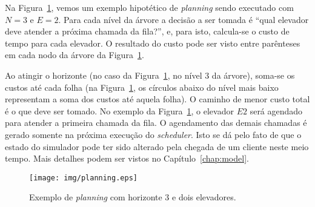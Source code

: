 Na Figura~\ref{fig:planning}, vemos um exemplo hipotético de \textit{planning}
sendo executado com $N = 3$ e $E = 2$. Para cada nível da árvore a decisão a ser
tomada é ``qual elevador deve atender a próxima chamada da fila?'', e, para
isto, calcula-se o custo de tempo para cada elevador. O resultado do custo
pode ser visto entre parênteses em cada nodo da árvore da
Figura~\ref{fig:planning}.

Ao atingir o horizonte (no caso da Figura~\ref{fig:planning}, no nível 3 da
árvore), soma-se os custos até cada folha (na Figura~\ref{fig:planning}, os
círculos abaixo do nível mais baixo representam a soma dos custos até aquela
folha). O caminho de menor custo total é o que deve ser tomado. No
exemplo da Figura~\ref{fig:planning}, o elevador $E2$ será agendado para atender
a primeira chamada da fila. O agendamento das demais chamadas é gerado somente
na próxima execução do \textit{scheduler}. Isto se dá pelo fato de que o estado
do simulador pode ter sido alterado pela chegada de um cliente neste meio tempo.
Mais detalhes podem ser vistos no Capítulo~\ref{chap:model}.

\begin{figure}[htb!]
  \centering
  \texttt{[image: img/planning.eps]}
  \caption{Exemplo de \textit{planning} com horizonte 3 e dois elevadores.}
\label{fig:planning}
\end{figure}